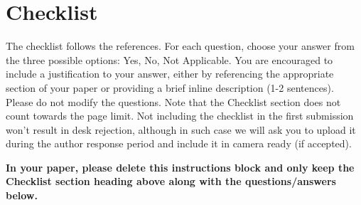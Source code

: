 \documentclass[twoside]{article}
\begin{document}





\newpage

\section*{Checklist}


The checklist follows the references. For each question, choose your answer from the three possible options: Yes, No, Not Applicable.  You are encouraged to include a justification to your answer, either by referencing the appropriate section of your paper or providing a brief inline description (1-2 sentences). 
Please do not modify the questions.  Note that the Checklist section does not count towards the page limit. Not including the checklist in the first submission won't result in desk rejection, although in such case we will ask you to upload it during the author response period and include it in camera ready (if accepted).

\textbf{In your paper, please delete this instructions block and only keep the Checklist section heading above along with the questions/answers below.}
\end{document}
